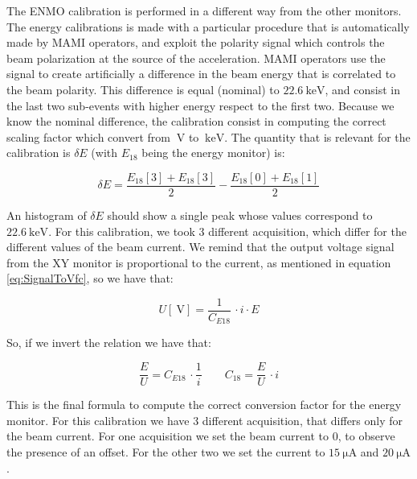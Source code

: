 The ENMO calibration is performed in a different way from the other monitors. The energy calibrations is made with a particular procedure that is automatically made by MAMI operators, and exploit the polarity signal which controls the beam polarization at the source of the acceleration. MAMI operators use the signal to create artificially a difference in the beam energy that is correlated to the beam polarity. This difference is equal (nominal) to $\SI{22.6}{\kilo \electronvolt}$, and consist in the last two sub-events with higher energy respect to the first two. Because we know the nominal difference, the calibration consist in computing the correct scaling factor which convert from $\SI{}{\volt}$ to $\SI{}{\kilo \electronvolt}$. The quantity that is relevant for the calibration is $\delta E$ (with $E_{18}$ being the energy monitor) is:

\begin{equation*}
\delta E = \frac{E_{18}[3] + E_{18}[3]}{2} - \frac{E_{18}[0] + E_{18}[1]}{2} 
\end{equation*}

An histogram of $\delta E$ should show a single peak whose values correspond to $\SI{22.6}{\kilo \electronvolt}$.
For this calibration, we took 3 different acquisition, which differ for the different values of the beam current. We remind that the output voltage signal from the XY monitor is proportional to the current, as mentioned in equation \ref{eq:SignalToVfc}, so we have that:

\begin{equation}
U[\SI{}{\volt}] = \frac{1}{C_{E18}} \, \cdot  i \cdot E
\end{equation}

So, if we invert the relation we have that:

\begin{equation}
\frac{E}{U} = C_{E18} \, \cdot \frac{1}{i} \qquad  C_{18} = \frac{E}{U} \, \cdot i
\end{equation}  

This is the final formula to compute the correct conversion factor for the energy monitor. 
For this calibration we have 3 different acquisition, that differs only for the beam current. For one acquisition we set the beam current to $0$, to observe the presence of an offset. For the other two we set the current to $\SI{15}{\micro \ampere}$ and $\SI{20}{\micro \ampere}$.

